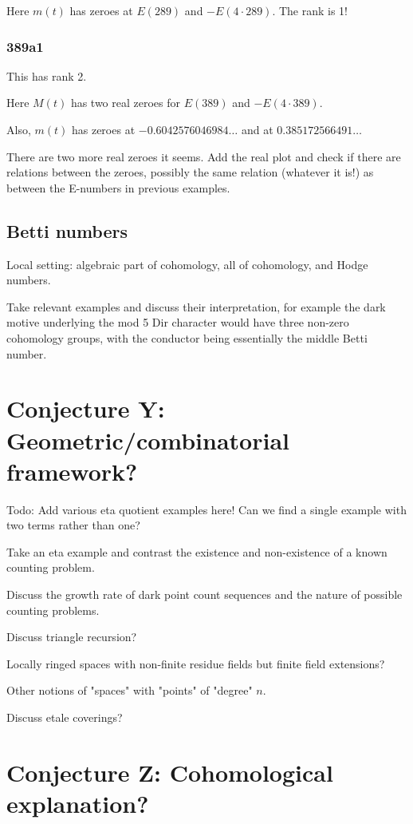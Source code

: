 \documentclass[paper=a4, fontsize=11pt]{scrartcl} %
\numberwithin{equation}{section} %
\numberwithin{figure}{section} %
\numberwithin{table}{section} %
\begin{document}
Here $m(t)$ has zeroes at $E(289)$ and $-E(4 \cdot 289)$. The rank is 1!

\subsubsection{389a1}

This has rank 2.

Here $M(t)$ has two real zeroes for $E(389)$ and $-E(4 \cdot 389)$.

Also, $m(t)$ has zeroes at $-0.6042576046984\ldots$ and at $0.385172566491\ldots$

There are two more real zeroes it seems. Add the real plot and check if there are relations between the zeroes, possibly the same relation (whatever it is!) as between the E-numbers in previous examples.
\subsection{Betti numbers}

Local setting: algebraic part of cohomology, all of cohomology, and Hodge numbers.

Take relevant examples and discuss their interpretation, for example the dark motive underlying the mod 5 Dir character would have three non-zero cohomology groups, with the conductor being essentially the middle Betti number.

\section{Conjecture Y: Geometric/combinatorial framework?}

Todo: Add various eta quotient examples here! Can we find a single example with two terms rather than one?

Take an eta example and contrast the existence and non-existence of a known counting problem.

Discuss the growth rate of dark point count sequences and the nature of possible counting problems.

Discuss triangle recursion?

Locally ringed spaces with non-finite residue fields but finite field extensions?

Other notions of "spaces" with "points" of "degree" $n$.

Discuss etale coverings?

\section{Conjecture Z: Cohomological explanation?}
\end{document}
